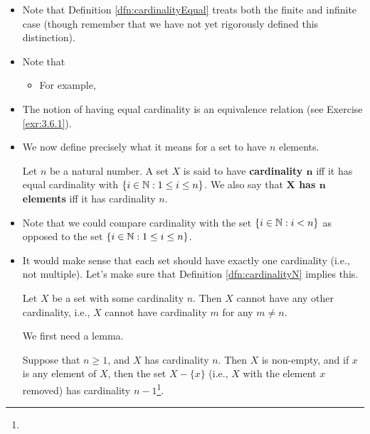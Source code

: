 \documentclass[../main.tex]{subfiles}
\begin{document}
\begin{itemize}
\begin{itemize}
    \end{itemize}
    \item Note that Definition \ref{dfn:cardinalityEqual} treats both the finite and infinite case (though remember that we have not yet rigorously defined this distinction).
    \item Note that 
    \begin{itemize}
        \item For example, 
    \end{itemize}
    \item The notion of having equal cardinality is an equivalence relation (see Exercise \ref{exr:3.6.1}).
    \item We now define precisely what it means for a set to have $n$ elements.
    \begin{dfn}\label{dfn:cardinalityN}
        Let $n$ be a natural number. A set $X$ is said to have \textbf{cardinality $\bm{n}$} iff it has equal cardinality with $\{i\in\mathbb{N}:1\leq i\leq n\}$. We also say that \textbf{$\bm{X}$ has $\bm{n}$ elements} iff it has cardinality $n$.
    \end{dfn}
    \item Note that we could compare cardinality with the set $\{i\in\mathbb{N}:i<n\}$ as opposed to the set $\{i\in\mathbb{N}:1\leq i\leq n\}$.
    \item It would make sense that each set should have exactly one cardinality (i.e., not multiple). Let's make sure that Definition \ref{dfn:cardinalityN} implies this.
    \begin{prp}\label{prp:cardinalityUniqueness}
        Let $X$ be a set with some cardinality $n$. Then $X$ cannot have any other cardinality, i.e., $X$ cannot have cardinality $m$ for any $m\neq n$.
    \end{prp}
    We first need a lemma.
    \begin{lem}\label{lem:cardinalitySetminus}
        Suppose that $n\geq 1$, and $X$ has cardinality $n$. Then $X$ is non-empty, and if $x$ is any element of $X$, then the set $X-\{x\}$ (i.e., $X$ with the element $x$ removed) has cardinality $n-1$\footnote{}.

\end{lem}
\end{itemize}
\end{document}
